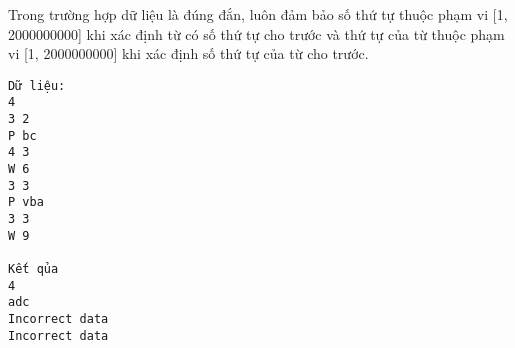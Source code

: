 Trong trường hợp dữ liệu là đúng đắn, luôn đảm bảo số thứ tự thuộc phạm vi [1, 2000000000] khi xác định từ có số thứ tự cho trước và thứ tự của từ thuộc phạm vi [1, 2000000000] khi xác định số thứ tự của từ cho trước.
\begin{verbatim}
Dữ liệu:
4
3 2
P bc
4 3
W 6
3 3
P vba
3 3
W 9

Kết qủa
4
adc
Incorrect data
Incorrect data
\end{verbatim}